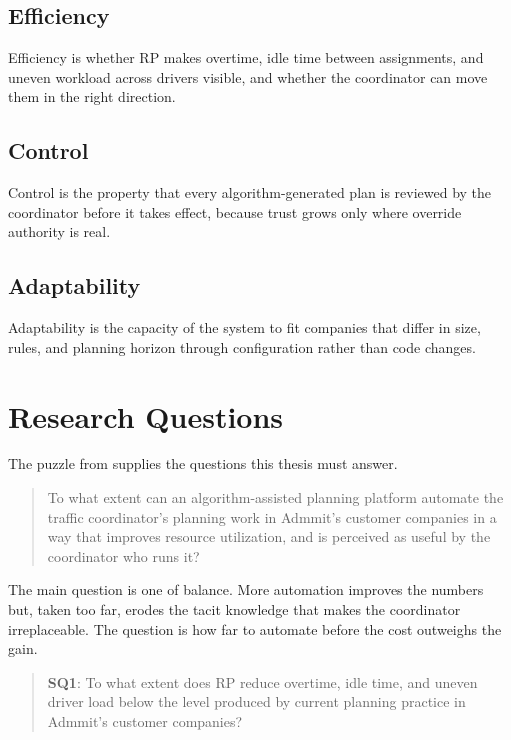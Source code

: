 \subsection{Efficiency}
\label{sec:anchor-efficiency}

Efficiency is whether RP makes overtime, idle time between assignments, and uneven workload across drivers visible, and whether the coordinator can move them in the right direction.


\subsection{Control}
\label{sec:anchor-trust-control}

Control is the property that every algorithm-generated plan is reviewed by the coordinator before it takes effect, because trust grows only where override authority is real.


\subsection{Adaptability}
\label{sec:anchor-adaptability}

Adaptability is the capacity of the system to fit companies that differ in size, rules, and planning horizon through configuration rather than code changes.



\section{Research Questions}
\label{sec:research-questions}

The puzzle from  supplies the questions this thesis must answer.

\begin{quote}
  To what extent can an algorithm-assisted planning platform automate the traffic coordinator's planning work in Admmit's customer companies in a way that improves resource utilization, and is perceived as useful by the coordinator who runs it?
\end{quote}

The main question is one of balance. More automation improves the numbers but, taken too far, erodes the tacit knowledge that makes the coordinator irreplaceable. The question is how far to automate before the cost outweighs the gain.

\begin{quote}
  \textbf{SQ1}: To what extent does RP reduce overtime, idle time, and uneven driver load below the level produced by current planning practice in Admmit's customer companies?
\end{quote}

